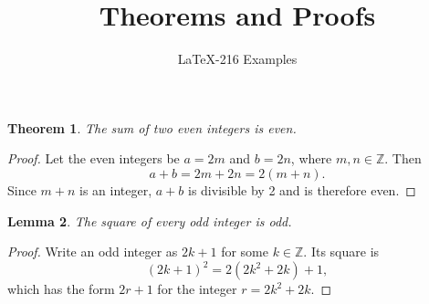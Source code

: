 \documentclass{article}
\title{Theorems and Proofs}
\author{LaTeX-216 Examples}
\date{}
\newtheorem{theorem}{Theorem}
\newtheorem{lemma}[theorem]{Lemma}
\begin{document}
\maketitle

\begin{theorem}
The sum of two even integers is even.
\end{theorem}

\begin{proof}
Let the even integers be $a=2m$ and $b=2n$, where $m,n\in\mathbb{Z}$.
Then
\[
  a+b=2m+2n=2(m+n).
\]
Since $m+n$ is an integer, $a+b$ is divisible by 2 and is therefore even.
\end{proof}

\begin{lemma}
The square of every odd integer is odd.
\end{lemma}

\begin{proof}
Write an odd integer as $2k+1$ for some $k\in\mathbb{Z}$. Its square is
\[
  (2k+1)^2=2(2k^2+2k)+1,
\]
which has the form $2r+1$ for the integer $r=2k^2+2k$.
\end{proof}
\end{document}
